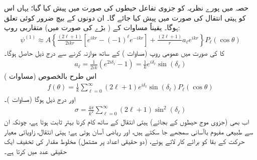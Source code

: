 حصہ  میں پورے نظریہ کو جزوی تفاعل حیطوں  کی صورت میں پیش کیا گیا؛ یہاں اس کو ہیتی انتقال  کی صورت میں پیش کیا جائے گا۔ ان دونوں کے بیچ ضرور کوئی تعلق ہوگا۔ یقیناً مساوات  کے ( بڑے  کی صورت میں) متقاربی روپ: 
\begin{align}
	\psi^{(1)}\approx A\left\{\frac{(2\ell+1)}{2ikr}\left[e^{ikr}-(-1)^{\ell}e^{-ikr}\right]+\frac{(2\ell+1)}{r}a_{\ell}e^{ikr}\right\}P_{\ell}(\cos\theta)
\end{align}
کا  کی صورت میں عمومی روپ (مساوات ) کے ساتھ موازنہ کرنے سے درج ذیل حاصل ہوگا۔
\begin{align}\label{مساوات_بکھراو_تعلق}
	a_{\ell}=\frac{1}{2ik}\left(e^{2i\delta_{\ell}}-1\right)=\frac{1}{k}e^{i\delta_{\ell}}\sin(\delta_{\ell})
\end{align}
اس طرح بالخصوص (مساوات )
\begin{align}\label{مساوات_بکھراو_درکار_آخری_الف}
	f(\theta) = \frac{1}{k}\sum_{\ell=0}^{\infty}(2\ell+1)e^{i\delta_{\ell}}\sin(\delta_{\ell})P_{\ell}(\cos\theta)
\end{align}
اور درج ذیل ہوگا (مساوات )۔
\begin{align}\label{مساوات_بکھراو_درکار_آخری_ب}
	\sigma=\frac{4\pi}{k^2}\sum_{\ell=0}^{\infty}(2\ell+1)\sin^2(\delta_{\ell})
\end{align}
اب بھی (جزوی موج حیطوں کے بجائے) ہیتی انتقال کے ساتھ کام کرنا بہتر ثابت ہوتا ہے، چونکہ ان سے طبیعی مفہوم باآسانی سمجھے جا سکتے ہیں، اور ریاضی آسان ہوتی ہے؛ ہیتی انتقال، زاویائی معیار حرکت کے بقا کو برائے کار لاتے ہوئے، (دو حقیقی اعداد پر مشتمل) مخلوط مقدار  کی تخفیف ایک حقیقی عدد  میں کرتا ہے۔


